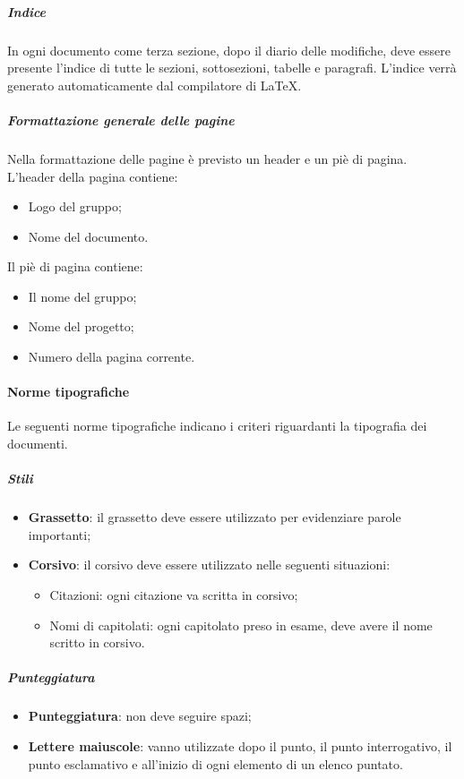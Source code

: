 \documentclass[../NormeDiProgetto_v3.0.0.tex]{subfiles}
\begin{document}
				\subparagraph{Indice}
				In ogni documento come terza sezione, dopo il diario delle modifiche, deve essere presente l'indice di tutte le sezioni, sottosezioni, tabelle e paragrafi.
				L'indice verrà generato automaticamente dal compilatore di \LaTeX .

				\subparagraph{Formattazione generale delle pagine}
				Nella formattazione delle pagine è previsto un header e un piè di pagina.
				L'header della pagina contiene:
				\begin{itemize}
					\item Logo del gruppo;
					\item Nome del documento.
				\end{itemize}
				Il piè di pagina contiene:
				\begin{itemize}
				\item Il nome del gruppo;
				\item Nome del progetto;
				\item Numero della pagina corrente.
				\end{itemize}

			\paragraph{Norme tipografiche}
				Le seguenti norme tipografiche indicano i criteri riguardanti la tipografia dei documenti.

				\subparagraph{Stili}
				\begin{itemize}
				\item \textbf{Grassetto}: il grassetto deve essere utilizzato per evidenziare parole importanti;
				\item \textbf{Corsivo}: il corsivo deve essere utilizzato nelle seguenti
				situazioni:
				\begin{itemize}
					\item Citazioni: ogni citazione va scritta in corsivo;
					\item Nomi di capitolati: ogni capitolato preso in esame, deve avere il nome scritto in corsivo.
				\end{itemize}
				\end{itemize}

				\subparagraph{Punteggiatura}
				\begin{itemize}
				\item \textbf{Punteggiatura}: non deve seguire spazi;
				\item \textbf{Lettere maiuscole}: vanno utilizzate dopo il punto, il punto interrogativo,
				il punto esclamativo e all'inizio di ogni elemento di un elenco puntato.
				\end{itemize}
\end{document}
